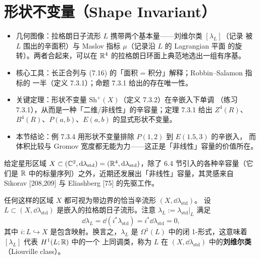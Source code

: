 
\section{形状不变量（Shape Invariant）}

\begin{keytakeaways}
\begin{itemize}
  \item 几何图像：拉格朗日子流形 $L$ 携带两个基本量——刘维尔类 $[\lambda_L]$（记录
        被 $L$ 围出的辛面积）与 Maslov 指标 $\mu$（记录沿 $L$ 的 Lagrangian 平面
        的旋转）。两者合起来，可以在 $\mathbb{R}^4$ 的拉格朗日环面上典范地选出一组有序基。
  \item 核心工具：长正合列与 (7.16) 的「面积 = 积分」解释；Robbin--Salamon 指标的
        一半（定义 7.3.1）；命题 7.3.1 给出的存在唯一性。
  \item 关键定理：形状不变量 $\mathrm{Sh}^+(X)$（定义 7.3.2）在辛嵌入下单调
        （练习 7.3.1），从而是一种「二维/非线性」的辛容量；定理 7.3.1 给出
        $Z^4(R)$、$B^4(R)$、$P(a,b)$、$E(a,b)$ 的显式形状不变量。
  \item 本节结论：例 7.3.4 用形状不变量排除 $P(1,2)$ 到 $E(1.5,3)$ 的辛嵌入，
        而体积比较与 Gromov 宽度都无能为力——这正是「非线性」容量的价值所在。
\end{itemize}
\end{keytakeaways}

给定星形区域 $X\subset(\mathbb{C}^2,\mathrm{d}\lambda_{\mathrm{std}})
=(\mathbb{R}^4,\mathrm{d}\lambda_{\mathrm{std}})$，除了 6.4 节引入的各种辛容量（它们是 $\mathbb{R}$
中的标量序列）之外，近期还发展出「非线性」容量，其灵感来自 Sikorav
[208,209] 与 Eliashberg [75] 的先驱工作。


任何这样的区域 $X$ 都可视为带边界的恰当辛流形 $(X,\dd\lambda_{\mathrm{std}})$。
设 $L\subset(X,\dd\lambda_{\mathrm{std}})$ 是嵌入的拉格朗日子流形。注意
$\lambda_L:=\lambda_{\mathrm{std}}|_L$ 满足
\begin{equation}\tag{7.15}
  \dd\lambda_L=\dd(i^*\lambda_{\mathrm{std}})=i^*\dd\lambda_{\mathrm{std}}=0,
\end{equation}
其中 $i\colon L\hookrightarrow X$ 是包含映射。换言之，$\lambda_L$ 是
$\Omega^1(L)$ 中的闭 1-形式，这意味着 $[\lambda_L]$ 代表 $H^1(L;\mathbb{R})$ 中的一个
上同调类，称为 $L$ 在 $(X,\dd\lambda_{\mathrm{std}})$ 中的\textbf{刘维尔类}
（Liouville class）。

